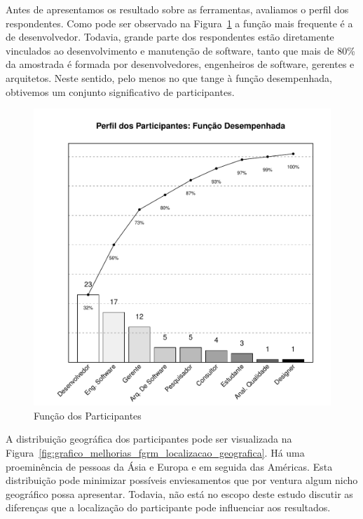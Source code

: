 Antes de apresentamos os resultado sobre as ferramentas, avaliamos o perfil dos
respondentes. Como pode ser observado na
Figura~\ref{fig:grafico_melhorias_fgrm_funcao_particantes} a função mais
frequente é a de desenvolvedor. Todavia, grande parte dos respondentes estão
diretamente vinculados ao desenvolvimento e manutenção de software, tanto que
mais de 80\% da amostrada é formada por desenvolvedores, engenheiros de
software, gerentes e arquitetos. Neste sentido, pelo menos no que tange à função
desempenhada, obtivemos um conjunto significativo de participantes.

\begin{figure}[htpb]
	\centering
	\includegraphics[width=0.6\linewidth]{./chapter-pesquisa-com-profissionais/img/grafico_melhoria_fgrm_funcao_participantes.pdf}
	\caption{Função dos Participantes}
\label{fig:grafico_melhorias_fgrm_funcao_particantes}
\end{figure}

A distribuição geográfica dos participantes pode ser visualizada na
Figura~\ref{fig:grafico_melhorias_fgrm_localizacao_geografica}. Há uma
proeminência de pessoas da Ásia e Europa e em seguida das Américas. Esta
distribuição pode minimizar possíveis enviesamentos que por ventura algum nicho
geográfico possa apresentar. Todavia, não está no escopo deste estudo discutir
as diferenças que a localização do participante pode influenciar aos resultados.

